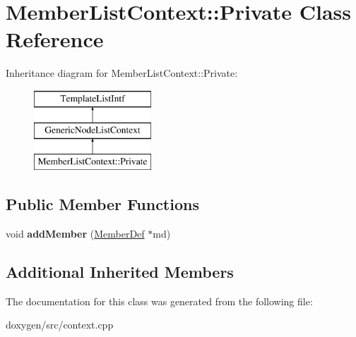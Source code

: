 \hypertarget{class_member_list_context_1_1_private}{}\section{Member\+List\+Context\+::Private Class Reference}
\label{class_member_list_context_1_1_private}
Inheritance diagram for Member\+List\+Context\+::Private\+:\begin{figure}[H]
\begin{center}
\leavevmode
\includegraphics[height=3.000000cm]{class_member_list_context_1_1_private}
\end{center}
\end{figure}
\subsection*{Public Member Functions}
\begin{DoxyCompactItemize}
\item 
\mbox{\label{class_member_list_context_1_1_private_a5fc5b73a52e190fa8a7b9e7a115d3f4b}} 
void {\bfseries add\+Member} (\mbox{\hyperlink{class_member_def}{Member\+Def}} $\ast$md)
\end{DoxyCompactItemize}
\subsection*{Additional Inherited Members}


The documentation for this class was generated from the following file\+:\begin{DoxyCompactItemize}
\item 
doxygen/src/context.\+cpp\end{DoxyCompactItemize}
